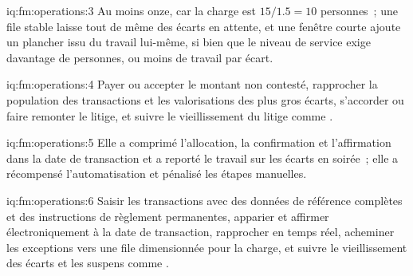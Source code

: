 \begin{solution}{iq:fm:operations:3}
Au moins onze, car la charge est $15/1.5=10$ personnes~; une file stable laisse tout de même des écarts en attente, et une fenêtre courte ajoute un plancher issu du travail
lui-même, si bien que le niveau de service exige davantage de personnes, ou moins de travail par écart.
\end{solution}

\begin{solution}{iq:fm:operations:4}
Payer ou accepter le montant non contesté, rapprocher la population des transactions et les valorisations des plus gros écarts, s'accorder ou faire remonter le litige, et suivre le
vieillissement du litige comme .
\end{solution}

\begin{solution}{iq:fm:operations:5}
Elle a comprimé l'allocation, la confirmation et l'affirmation dans la date de transaction et a reporté le travail sur les écarts en soirée~; elle a récompensé l'automatisation et
pénalisé les étapes manuelles.
\end{solution}

\begin{solution}{iq:fm:operations:6}
Saisir les transactions avec des données de référence complètes et des instructions de règlement permanentes, apparier et affirmer électroniquement à la date de transaction, rapprocher en
temps réel, acheminer les exceptions vers une file dimensionnée pour la charge, et suivre le vieillissement des écarts et les suspens comme .
\end{solution}

